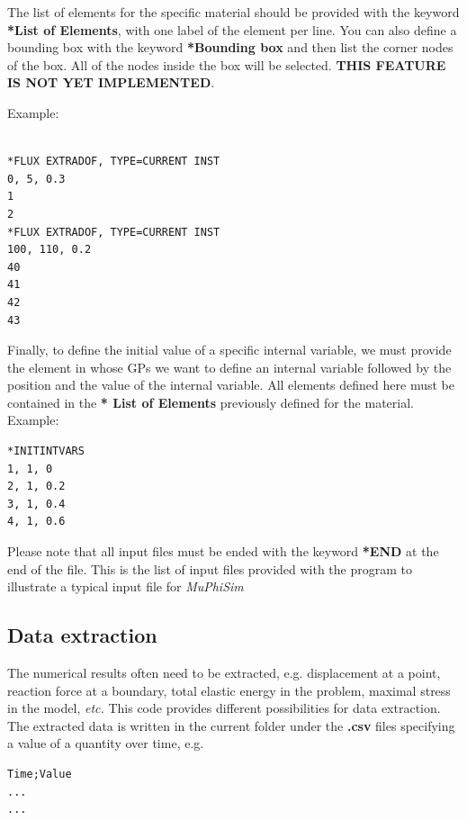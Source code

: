 \documentclass[oneside,11pt,times]{book}
\begin{document}
The list of elements for the specific material should be provided with the keyword  \textbf{*List of Elements}, with one label of the element per line. You can also define a bounding box with the keyword \textbf{*Bounding box} and then list the corner nodes of the box. All of the nodes inside the box will be selected. \textbf{THIS FEATURE IS NOT YET IMPLEMENTED}.

Example:
\begin{lstlisting}

*FLUX EXTRADOF, TYPE=CURRENT INST
0, 5, 0.3
1
2
*FLUX EXTRADOF, TYPE=CURRENT INST
100, 110, 0.2
40
41
42
43
\end{lstlisting}
Finally, to define the initial value of a specific internal variable, we must provide the element in whose GPs we want to define an internal variable followed by the position and the value of the internal variable. All elements defined here must be contained in the \textbf {* List of Elements} previously defined for the material.
Example:
\begin{lstlisting}
*INITINTVARS
1, 1, 0
2, 1, 0.2
3, 1, 0.4
4, 1, 0.6
\end{lstlisting}
Please note that all input files must be ended with the keyword \textbf{*END} at the end of the file. This is the list of input files provided with the program to illustrate a typical input file for \textit{MuPhiSim}

\subsection{Data extraction}

The numerical results often need to be extracted, e.g. displacement at a point, reaction force at a boundary, total elastic energy in the problem, maximal stress in the model, \emph{etc.} This code provides different possibilities for data extraction. The extracted data is written in the current folder under the \textbf{.csv} files specifying a value of a quantity over time, e.g.
\begin{lstlisting}
Time;Value
...
...
\end{lstlisting}
\end{document}
